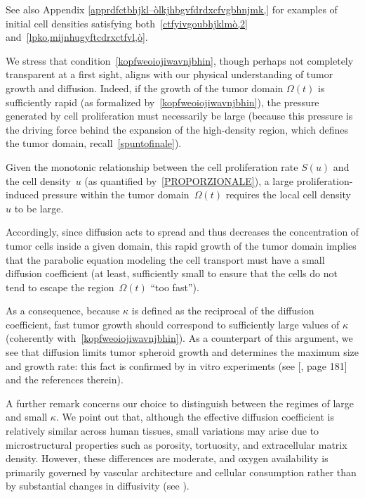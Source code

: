 \documentclass[12pt,a4paper,intlimits,sumlimits]{amsart}
\theoremstyle{definition}
\theoremstyle{plain}
\numberwithin{equation}{section}
\begin{document}
See also Appendix \ref{apprdfctbhjkl–òlkjhbgvfdrdxcfvgbhnjmk,} for examples of initial cell densities
satisfying both~\eqref{ctfyivgoubhjklmò,2} and~\eqref{lpko,mijnhugyftcdrxctfvl,ò}.

We stress that condition~\eqref{kopfweoiojiwavnjbhin}, though perhaps not completely transparent at a first sight, aligns with our physical understanding of tumor growth and diffusion.
Indeed,
if the growth of the tumor domain ${\Omega(t)}$ is sufficiently rapid (as formalized by~\eqref{kopfweoiojiwavnjbhin}), the pressure generated by cell proliferation must necessarily be large
(because this pressure is the driving force behind the expansion of the high-density region, which defines the tumor domain, recall~\eqref{spuntofinale}).

Given the monotonic relationship between the cell proliferation rate $S(u)$ and the cell density~$u$ (as quantified by~\eqref{PROPORZIONALE}), a large proliferation-induced pressure within the tumor domain~$\Omega(t)$ requires the local cell density~$u$ to be large.

Accordingly,
since diffusion acts to spread and thus decreases the concentration of tumor cells inside a given domain, this rapid growth of the tumor domain implies that the parabolic equation modeling the cell transport must have a small diffusion coefficient
(at least, sufficiently small to ensure that the cells do not tend to escape the region~$\Omega(t)$ ``too fast'').

As a consequence, because $\kappa$ is defined as the
reciprocal of the diffusion coefficient, fast tumor growth should correspond to sufficiently large values of $\kappa$ (coherently with~\eqref{kopfweoiojiwavnjbhin}).
As a counterpart of this argument, we see that diffusion limits tumor spheroid
growth and determines the maximum size and growth rate: this fact is confirmed by in vitro
experiments (see [\cite{MR2327053}, page 181] and the references therein).

A further remark concerns our choice to distinguish between the regimes of large and small $\kappa$.
We point out that, although the effective diffusion coefficient is relatively similar across human tissues, small variations may arise due to microstructural properties such as porosity, tortuosity, and extracellular matrix density. However, these differences are moderate, and oxygen availability is primarily governed by vascular architecture and cellular consumption rather than by substantial changes in diffusivity (see \cite{sykova08, vaupel07}).
\end{document}
